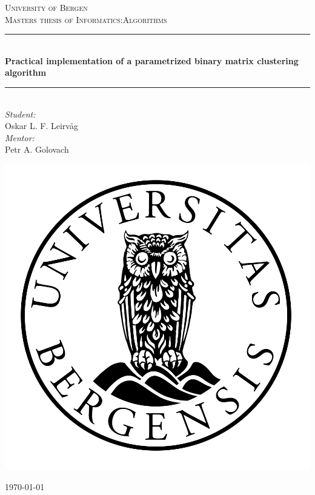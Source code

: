 \begin{titlepage}
    \newcommand{\HRule}{\rule{\linewidth}{0.5mm}}
    \center

    \textsc{\LARGE University of Bergen}\\[1.5cm] %
    \textsc{\large Masters thesis of Informatics:Algorithms}\\[0.5cm] %

    \HRule \\[0.4cm]
    { \huge \bfseries Practical implementation of a parametrized binary matrix clustering algorithm}\\[0.4cm] %
    \HRule \\[1.5cm]

    \Large \emph{Student:}\\
    Oskar L. F. Leirvåg\\
    \Large \emph{Mentor:}\\
	Petr A. Golovach
    \\[2cm] %

    \centerline{\includegraphics[scale=0.5]{figures/canvas}} %

    {\large \today}\\[3cm] %

    \vfill
\end{titlepage}
